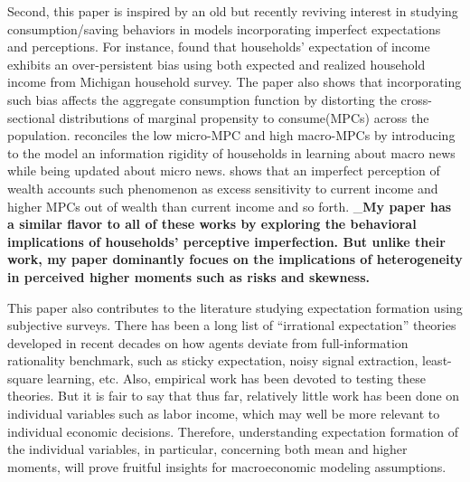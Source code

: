 \documentclass[12pt,notitlepage,onecolumn,aps,pra]{revtex4-1}
\begin{document}
Second, this paper is inspired by an old but recently reviving interest
in studying consumption/saving behaviors in models incorporating
imperfect expectations and perceptions. For instance,
\cite{rozsypal_overpersistence_2017} found that households' expectation
of income exhibits an over-persistent bias using both expected and
realized household income from Michigan household survey. The paper also
shows that incorporating such bias affects the aggregate consumption
function by distorting the cross-sectional distributions of marginal
propensity to consume(MPCs) across the population.
\cite{carroll_sticky_2018} reconciles the low micro-MPC and high
macro-MPCs by introducing to the model an information rigidity of
households in learning about macro news while being updated about micro
news. \cite{lian2019imperfect} shows that an imperfect perception of
wealth accounts such phenomenon as excess sensitivity to current income
and higher MPCs out of wealth than current income and so forth.
\_\textbf{My paper has a similar flavor to all of these works by
exploring the behavioral implications of households' perceptive
imperfection. But unlike their work, my paper dominantly focues on the
implications of heterogeneity in perceived higher moments such as risks
and skewness.}

This paper also contributes to the literature studying expectation
formation using subjective surveys. There has been a long list of
``irrational expectation'' theories developed in recent decades on how
agents deviate from full-information rationality benchmark, such as
sticky expectation, noisy signal extraction, least-square learning, etc.
Also, empirical work has been devoted to testing these theories. But it
is fair to say that thus far, relatively little work has been done on
individual variables such as labor income, which may well be more
relevant to individual economic decisions. Therefore, understanding
expectation formation of the individual variables, in particular,
concerning both mean and higher moments, will prove fruitful insights
for macroeconomic modeling assumptions.
\end{document}

